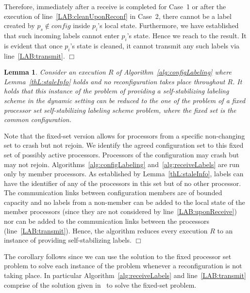 \documentclass[11pt]{article}
\newtheorem{lemma}[theorem]{Lemma}
\newenvironment{proof}{\noindent{\bf Proof.}}{\hfill$\Box$}
\begin{document}
\begin{proof}
Therefore, immediately after a receive is completed for Case~1 or after the execution of line~\ref{LAB:cleanUponReconf} in Case~2, there cannot be a label created by $p_s \not \in config$ inside $p_i$'s local state.
Furthermore, we have established that such incoming labels cannot enter $p_i$'s state.
Hence we reach to the result.
It is evident that once $p_i$'s state is cleaned, it cannot transmit any such labels via line~\ref{LAB:transmit}.
\end{proof}


\begin{lemma} \label{thL:map2SSVS}
Consider an execution $R$ of Algorithm~\ref{alg:configLabeling} where Lemma~\ref{thL:staleInfo} holds and no reconfiguration takes place throughout $R$. 
It holds that this instance of the problem of providing a self-stabilizing labeling scheme in the dynamic setting can be reduced to the one of the problem of a fixed processor set self-stabilizing labeling scheme problem, where the fixed set is the common configuration. 
\end{lemma}

\begin{proof}
Note that the fixed-set version allows for processors from a specific non-changing set to crash but not rejoin.
We identify the agreed configuration set to this fixed set of possibly active processors.
Processors of the configuration may crash but may not rejoin.
Algorithms~\ref{alg:configLabeling} and~\ref{alg:receiveLabels} are run only by member processors.
As established by Lemma~\ref{thL:staleInfo}, labels can have the identifier of any of the processors in this set but of no other processor.
The communication links between configuration members are of bounded capacity and no labels from a non-member can be added to the local state of the member processors (since they are not considered by line~\ref{LAB:uponReceive}) nor can be added to the communication links between the processors (line~\ref{LAB:transmit}).
Hence, the algorithm reduces every execution $R$ to an instance of providing self-stabilizing labels. 
\end{proof}
\vspace{.5em}

The corollary follows since we can use the solution to the fixed processor set problem to solve each instance of the problem whenever a reconfiguration is not taking place.
In particular Algorithm~\ref{alg:receiveLabels} and line~\ref{LAB:transmit} comprise of the solution given in~\cite{SSVS} to solve the fixed-set problem.
\end{document}
